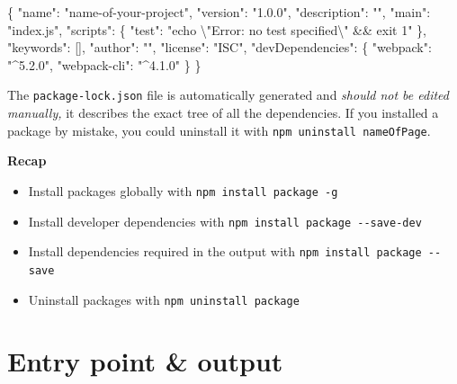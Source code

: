 \documentclass[10pt,]{krantz}
\makeatletter
\newenvironment{Shaded}{\begin{snugshade}}{\end{snugshade}}
\newcommand{\CharTok}[1]{\textcolor[rgb]{0.5,0.5,0.5}{#1}}
\newcommand{\DataTypeTok}[1]{\textcolor[rgb]{0.27,0.27,0.27}{#1}}
\newcommand{\FunctionTok}[1]{\textcolor[rgb]{0,0,0}{#1}}
\newcommand{\OtherTok}[1]{\textcolor[rgb]{0.37,0.37,0.37}{#1}}
\newcommand{\StringTok}[1]{\textcolor[rgb]{0.5,0.5,0.5}{#1}}
\providecommand{\tightlist}{%
  \setlength{\itemsep}{0pt}\setlength{\parskip}{0pt}}
\newenvironment{kframe}{%
\medskip{}
\setlength{\fboxsep}{.8em}
 \def\at@end@of@kframe{}%
 \ifinner\ifhmode%
  \def\at@end@of@kframe{\end{minipage}}%
  \begin{minipage}{\columnwidth}%
 \fi\fi%
 \def\FrameCommand##1{\hskip\@totalleftmargin \hskip-\fboxsep
 \colorbox{shadecolor}{##1}\hskip-\fboxsep
     \hskip-\linewidth \hskip-\@totalleftmargin \hskip\columnwidth}%
 \MakeFramed {\advance\hsize-\width
   \@totalleftmargin\z@ \linewidth\hsize
   \@setminipage}}%
 {\par\unskip\endMakeFramed%
 \at@end@of@kframe}
\renewenvironment{Shaded}{\begin{kframe}}{\end{kframe}}
\makeatother
\begin{document}
\begin{Shaded}
\begin{Highlighting}[]
\FunctionTok{\{}
  \DataTypeTok{"name"}\FunctionTok{:} \StringTok{"name-of-your-project"}\FunctionTok{,}
  \DataTypeTok{"version"}\FunctionTok{:} \StringTok{"1.0.0"}\FunctionTok{,}
  \DataTypeTok{"description"}\FunctionTok{:} \StringTok{""}\FunctionTok{,}
  \DataTypeTok{"main"}\FunctionTok{:} \StringTok{"index.js"}\FunctionTok{,}
  \DataTypeTok{"scripts"}\FunctionTok{:} \FunctionTok{\{}
    \DataTypeTok{"test"}\FunctionTok{:} \StringTok{"echo }\CharTok{\textbackslash{}"}\StringTok{Error: no test specified}\CharTok{\textbackslash{}"}\StringTok{ && exit 1"}
  \FunctionTok{\},}
  \DataTypeTok{"keywords"}\FunctionTok{:} \OtherTok{[]}\FunctionTok{,}
  \DataTypeTok{"author"}\FunctionTok{:} \StringTok{""}\FunctionTok{,}
  \DataTypeTok{"license"}\FunctionTok{:} \StringTok{"ISC"}\FunctionTok{,}
  \DataTypeTok{"devDependencies"}\FunctionTok{:} \FunctionTok{\{}
    \DataTypeTok{"webpack"}\FunctionTok{:} \StringTok{"^5.2.0"}\FunctionTok{,}
    \DataTypeTok{"webpack-cli"}\FunctionTok{:} \StringTok{"^4.1.0"}
  \FunctionTok{\}}
\FunctionTok{\}}
\end{Highlighting}
\end{Shaded}

The \texttt{package-lock.json} file is automatically generated and \emph{should not be edited manually,} it describes the exact tree of all the dependencies. If you installed a package by mistake, you could uninstall it with \texttt{npm\ uninstall\ nameOfPage}.

\textbf{Recap}

\begin{itemize}
\tightlist
\item
  Install packages globally with \texttt{npm\ install\ package\ -g}
\item
  Install developer dependencies with \texttt{npm\ install\ package\ -\/-save-dev}
\item
  Install dependencies required in the output with \texttt{npm\ install\ package\ -\/-save}
\item
  Uninstall packages with \texttt{npm\ uninstall\ package}
\end{itemize}

\hypertarget{webpack-intro-entry-points}{%
\section{Entry point \& output}\label{webpack-intro-entry-points}}
\end{document}
